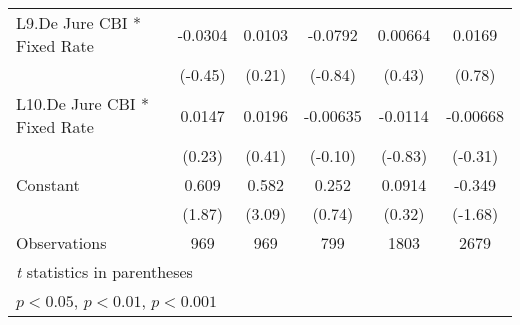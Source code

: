 {\begin{longtable}{l*{5}{c}}
L9.De Jure CBI * Fixed Rate&  -0.0304         &   0.0103         &  -0.0792         &  0.00664         &   0.0169         \\
                &  (-0.45)         &   (0.21)         &  (-0.84)         &   (0.43)         &   (0.78)         \\
[1em]
L10.De Jure CBI * Fixed Rate&   0.0147         &   0.0196         & -0.00635         &  -0.0114         & -0.00668         \\
                &   (0.23)         &   (0.41)         &  (-0.10)         &  (-0.83)         &  (-0.31)         \\
[1em]
Constant        &    0.609         &    0.582\sym{**} &    0.252         &   0.0914         &   -0.349         \\
                &   (1.87)         &   (3.09)         &   (0.74)         &   (0.32)         &  (-1.68)         \\
\hline
Observations    &      969         &      969         &      799         &     1803         &     2679         \\
\hline\hline
\multicolumn{6}{l}{\footnotesize \textit{t} statistics in parentheses}\\
\multicolumn{6}{l}{\footnotesize \sym{*} \(p<0.05\), \sym{**} \(p<0.01\), \sym{***} \(p<0.001\)}\\
\end{longtable}
}
